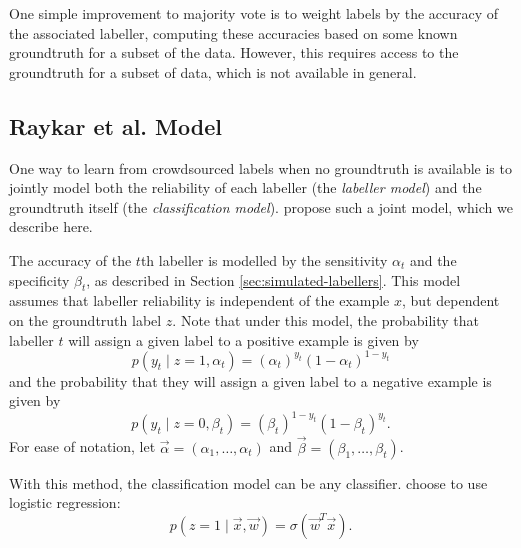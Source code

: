         One simple improvement to majority vote is to weight labels by the
        accuracy of the associated labeller, computing these accuracies based on
        some known groundtruth for a subset of the data. However, this requires
        access to the groundtruth for a subset of data, which is not available
        in general.

    \subsection{Raykar et al. Model}
    \label{sec:raykar}

        One way to learn from crowdsourced labels when no groundtruth is
        available is to jointly model both the reliability of each labeller (the
        \emph{labeller model}) and the groundtruth itself (the
        \emph{classification model}). \citet{raykar10} propose such a joint model, which we describe here.

        The accuracy of the $t$th labeller is modelled by the sensitivity
        $\alpha_t$ and the specificity $\beta_t$, as described in Section
        \ref{sec:simulated-labellers}. This model assumes that labeller
        reliability is independent of the example $x$, but dependent on the
        groundtruth label $z$. Note that under this model, the probability that
        labeller $t$ will assign a given label to a positive example is given by
        \begin{equation*}
            p(y_t \mid z = 1, \alpha_t) =
                (\alpha_t)^{y_t} (1 - \alpha_t)^{1 - y_t}
        \end{equation*}
        and the probability that they will assign a given label to a negative
        example is given by
        \begin{equation*}
            p(y_t \mid z = 0, \beta_t) =
                (\beta_t)^{1 - y_t} (1 - \beta_t)^{y_t}.
        \end{equation*}
        For ease of notation, let $\vec \alpha = (\alpha_1, \dots, \alpha_t)$
        and $\vec \beta = (\beta_1, \dots, \beta_t)$.

        With this method, the classification model can be any classifier.
        \citeauthor{raykar10} choose to use logistic regression:
        \begin{equation}
            \label{eq:raykar-logreg}
            p(z = 1 \mid \vec x, \vec w) = \sigma(\vec w^T \vec x).
        \end{equation}

